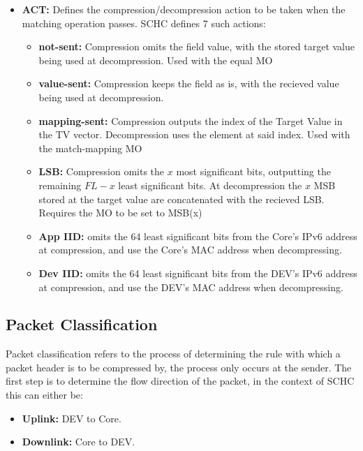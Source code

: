 \documentclass[cspaper]{IEEEtran}
\numberwithin{equation}{subsection}
\begin{document}
\begin{itemize}
		\item \textbf{ACT:}
				Defines the compression/decompression action to be taken when the matching operation passes. SCHC defines 7 such actions:
				
			\begin{adjustwidth}{1em}{0em}
				\begin{itemize}
					\item \textbf{not-sent:} Compression omits the field value, with the stored target value being used at decompression. Used with the equal MO
					\item \textbf{value-sent:} Compression keeps the field as is,  with the recieved value being used at decompression.
					\item \textbf{mapping-sent:} Compression outputs the index of the Target Value in the TV vector. Decompression uses the element at said index. Used with the 
						match-mapping MO
					\item \textbf{LSB:} Compression omits the $x$ most significant bits, outputting the remaining $FL-x$ least significant bits. At decompression the $x$ MSB stored
						at the target value are concatenated with the recieved LSB. Requires the MO to be set to MSB(x) 
					
					\item \textbf{App IID:} omits the 64 least significant bits from the Core's IPv6 address at compression, and use the Core's MAC address when decompressing.
					\item \textbf{Dev IID:} omits the 64 least significant bits from the DEV's IPv6 address at compression, and use the DEV's MAC address when decompressing.

				\end{itemize}
			\end{adjustwidth}
	\end{itemize}

	\subsection{Packet Classification}
	Packet classification refers to the process of determining the rule with which a packet header is to be
	compressed by, the process only occurs at the sender. The first step is to determine the flow direction of the packet, in the context 
	of SCHC this can either be:
	\begin{itemize}
		\item \textbf{Uplink:} DEV to Core.
		\item \textbf{Downlink:} Core to DEV.
	\end{itemize}
\end{document}
